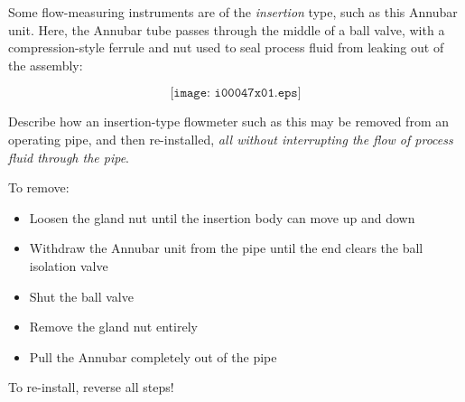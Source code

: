 

Some flow-measuring instruments are of the {\it insertion} type, such as this Annubar unit.  Here, the Annubar tube passes through the middle of a ball valve, with a compression-style ferrule and nut used to seal process fluid from leaking out of the assembly:

$$\texttt{[image: i00047x01.eps]}$$

Describe how an insertion-type flowmeter such as this may be removed from an operating pipe, and then re-installed, {\it all without interrupting the flow of process fluid through the pipe}.








To remove:

\begin{itemize}
\item{} Loosen the gland nut until the insertion body can move up and down
\item{} Withdraw the Annubar unit from the pipe until the end clears the ball isolation valve
\item{} Shut the ball valve
\item{} Remove the gland nut entirely
\item{} Pull the Annubar completely out of the pipe
\end{itemize}

\vskip 10pt

To re-install, reverse all steps!











